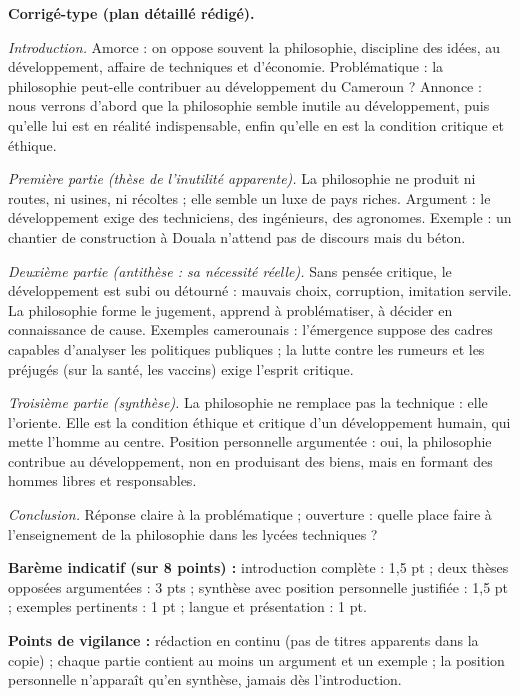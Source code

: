 \documentclass[11pt]{article}
\begin{document}
\begin{corrige}
\textbf{Corrigé-type (plan détaillé rédigé).}

\emph{Introduction.} Amorce : on oppose souvent la philosophie, discipline des idées, au développement, affaire de techniques et d'économie. Problématique : la philosophie peut-elle contribuer au développement du Cameroun ? Annonce : nous verrons d'abord que la philosophie semble inutile au développement, puis qu'elle lui est en réalité indispensable, enfin qu'elle en est la condition critique et éthique.

\emph{Première partie (thèse de l'inutilité apparente).} La philosophie ne produit ni routes, ni usines, ni récoltes ; elle semble un luxe de pays riches. Argument : le développement exige des techniciens, des ingénieurs, des agronomes. Exemple : un chantier de construction à Douala n'attend pas de discours mais du béton.

\emph{Deuxième partie (antithèse : sa nécessité réelle).} Sans pensée critique, le développement est subi ou détourné : mauvais choix, corruption, imitation servile. La philosophie forme le jugement, apprend à problématiser, à décider en connaissance de cause. Exemples camerounais : l'émergence suppose des cadres capables d'analyser les politiques publiques ; la lutte contre les rumeurs et les préjugés (sur la santé, les vaccins) exige l'esprit critique.

\emph{Troisième partie (synthèse).} La philosophie ne remplace pas la technique : elle l'oriente. Elle est la condition éthique et critique d'un développement humain, qui mette l'homme au centre. Position personnelle argumentée : oui, la philosophie contribue au développement, non en produisant des biens, mais en formant des hommes libres et responsables.

\emph{Conclusion.} Réponse claire à la problématique ; ouverture : quelle place faire à l'enseignement de la philosophie dans les lycées techniques ?

\textbf{Barème indicatif (sur 8 points) :} introduction complète : 1,5 pt ; deux thèses opposées argumentées : 3 pts ; synthèse avec position personnelle justifiée : 1,5 pt ; exemples pertinents : 1 pt ; langue et présentation : 1 pt.

\textbf{Points de vigilance :} rédaction en continu (pas de titres apparents dans la copie) ; chaque partie contient au moins un argument et un exemple ; la position personnelle n'apparaît qu'en synthèse, jamais dès l'introduction.
\end{corrige}
\end{document}
